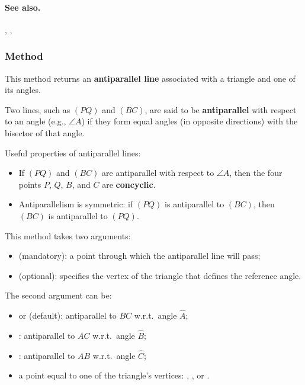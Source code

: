 \paragraph{See also.} , , 

\subsubsection{Method }
\label{antiparallel}

This method returns an \textbf{antiparallel line} associated with a triangle and one of its angles.

\medskip
\noindent
Two lines, such as $(PQ)$ and $(BC)$, are said to be \textbf{antiparallel} with respect to an angle (e.g., $\angle A$) if they form equal angles (in opposite directions) with the bisector of that angle.

\medskip
\noindent
Useful properties of antiparallel lines:
\begin{itemize}
  \item If $(PQ)$ and $(BC)$ are antiparallel with respect to $\angle A$, then the four points $P$, $Q$, $B$, and $C$ are \textbf{concyclic}.
  \item Antiparallelism is symmetric: if $(PQ)$ is antiparallel to $(BC)$, then $(BC)$ is antiparallel to $(PQ)$.
\end{itemize}

\medskip
\noindent
This method takes two arguments:
\begin{itemize}
  \item {} (mandatory): a point through which the antiparallel line will pass;
  \item {} (optional): specifies the vertex of the triangle that defines the reference angle.
\end{itemize}

\noindent
The second argument  can be:
\begin{itemize}
  \item {} or  (default): antiparallel to $BC$ w.r.t.\ angle $\widehat{A}$;
  \item {}: antiparallel to $AC$ w.r.t.\ angle $\widehat{B}$;
  \item {}: antiparallel to $AB$ w.r.t.\ angle $\widehat{C}$;
  \item a point equal to one of the triangle’s vertices: , , or .
\end{itemize}

